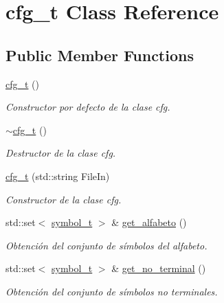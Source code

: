 \hypertarget{classcfg__t}{}\section{cfg\+\_\+t Class Reference}
\label{classcfg__t}
\subsection*{Public Member Functions}
\begin{DoxyCompactItemize}
\item 
\mbox{\label{classcfg__t_ab231f8ec11cfeb7355e9faad6e25c848}} 
\hyperlink{classcfg__t_ab231f8ec11cfeb7355e9faad6e25c848}{cfg\+\_\+t} ()
\begin{DoxyCompactList}\small\item\em Constructor por defecto de la clase cfg. \end{DoxyCompactList}\item 
\mbox{\label{classcfg__t_ad822f02297a35a5557c2fce33f7c6dca}} 
\hyperlink{classcfg__t_ad822f02297a35a5557c2fce33f7c6dca}{$\sim$cfg\+\_\+t} ()
\begin{DoxyCompactList}\small\item\em Destructor de la clase cfg. \end{DoxyCompactList}\item 
\hyperlink{classcfg__t_a3a78057122dddd7d1fd860bed69fca34}{cfg\+\_\+t} (std\+::string File\+In)
\begin{DoxyCompactList}\small\item\em Constructor de la clase cfg. \end{DoxyCompactList}\item 
std\+::set$<$ \hyperlink{classsymbol__t}{symbol\+\_\+t} $>$ \& \hyperlink{classcfg__t_a28aad145e2844e938e5788f6b6547d9b}{get\+\_\+alfabeto} ()
\begin{DoxyCompactList}\small\item\em Obtención del conjunto de símbolos del alfabeto. \end{DoxyCompactList}\item 
std\+::set$<$ \hyperlink{classsymbol__t}{symbol\+\_\+t} $>$ \& \hyperlink{classcfg__t_a6ad5e12f79592554a1fd27a599e1b820}{get\+\_\+no\+\_\+terminal} ()
\begin{DoxyCompactList}\small\item\em Obtención del conjunto de símbolos no terminales. \end{DoxyCompactList}\item 

\end{DoxyCompactItemize}
